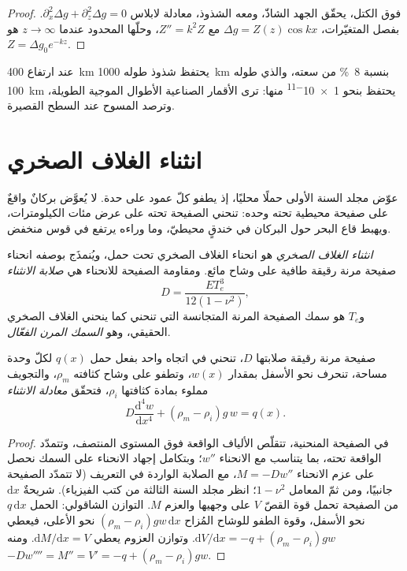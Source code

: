 \begin{proof}
فوق الكتل، يحقّق الجهد الشاذّ، ومعه الشذوذ، معادلة
لابلاس $\partial_x^2\Delta g + \partial_z^2\Delta g = 0$. بفصل
المتغيّرات، $\Delta g = Z(z)\cos kx$ مع $Z'' = k^2Z$، وحلّها المحدود عندما
$z \to \infty$ هو $Z = \Delta g_0e^{-kz}$.
\end{proof}

عند ارتفاع \qty{400}{km} يحتفظ شذوذ طوله \qty{1000}{km} بنسبة \qty{8}{\percent}
من سعته، والذي طوله \qty{100}{km} يحتفظ بنحو \num{1e-11} منها:
ترى الأقمار الصناعية الأطوال الموجية الطويلة، وترصد المسوح عند السطح القصيرة.

\section{انثناء الغلاف الصخري}

عوّض مجلد السنة الأولى حملًا محليًا، إذ يطفو كلّ عمود على حدة.
لا يُعوَّض بركانٌ واقعٌ على صفيحة محيطية تحته وحده: تنحني الصفيحة
تحته على عرض مئات الكيلومترات، ويهبط قاع البحر حول البركان في خندقٍ محيطيّ،
وما وراءه يرتفع في قوس منخفض.

\begin{definition}\label{def:b3:gravity-geodesy:flexure}
\emph{انثناء الغلاف الصخري} هو انحناء
الغلاف الصخري تحت حمل، ويُنمذَج بوصفه انحناء صفيحة مرنة رقيقة
طافية على وشاح مائع. ومقاومة الصفيحة للانحناء هي
\emph{صلابة الانثناء}
\[
  D = \frac{ET_e^3}{12(1 - \nu^2)},
\]
و$T_e$ هو سمك الصفيحة المرنة المتجانسة التي تنحني كما ينحني الغلاف الصخري الحقيقي،
وهو \emph{السمك المرن الفعّال}.
\end{definition}

\begin{theorem}\label{thm:b3:gravity-geodesy:plate}
صفيحة مرنة رقيقة صلابتها $D$، تنحني في اتجاه واحد بفعل حمل $q(x)$
لكلّ وحدة مساحة، تنحرف نحو الأسفل بمقدار $w(x)$، وتطفو على وشاح كثافته
$\rho_m$، والتجويف مملوء بمادة كثافتها $\rho_i$، فتحقّق
\emph{معادلة الانثناء}
\[
  D\frac{\mathrm d^4w}{\mathrm dx^4} + (\rho_m - \rho_i)g\,w = q(x) .
\]
\end{theorem}

\begin{proof}
في الصفيحة المنحنية، تتقلّص الألياف الواقعة فوق المستوى المنتصف،
وتتمدّد الواقعة تحته، بما يتناسب مع الانحناء $w''$؛ وبتكامل إجهاد الانحناء
على السمك نحصل على عزم الانحناء $M = -Dw''$، مع
الصلابة الواردة في التعريف (لا تتمدّد الصفيحة جانبيًا، ومن ثمّ المعامل
$1 - \nu^2$؛ انظر مجلد السنة الثالثة من كتب الفيزياء). شريحةٌ $\mathrm dx$ من الصفيحة
تحمل قوة القصّ $V$ على وجهيها والعزم $M$. التوازن الشاقولي:
الحمل $q\,\mathrm dx$ نحو الأسفل، وقوة الطفو للوشاح المُزاح
$(\rho_m - \rho_i)gw\,\mathrm dx$ نحو الأعلى، فيعطي $\mathrm dV/\mathrm dx = -q +
(\rho_m - \rho_i)gw$. وتوازن العزوم يعطي $\mathrm dM/\mathrm dx = V$.
ومنه $-Dw'''' = M'' = V' = -q + (\rho_m - \rho_i)gw$.
\end{proof}

